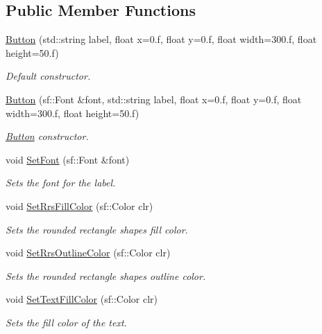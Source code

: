 \subsection*{Public Member Functions}
\begin{DoxyCompactItemize}
\item 
\mbox{\hyperlink{class_game_objects_1_1_button_a8fdd102aa18578cfed540502e2c25a37}{Button}} (std\+::string label, float x=0.f, float y=0.f, float width=300.f, float height=50.f)
\begin{DoxyCompactList}\small\item\em Default constructor. \end{DoxyCompactList}\item 
\mbox{\hyperlink{class_game_objects_1_1_button_a8cde4e0917819f05e9cf408c14bbc141}{Button}} (sf\+::\+Font \&font, std\+::string label, float x=0.f, float y=0.f, float width=300.f, float height=50.f)
\begin{DoxyCompactList}\small\item\em \mbox{\hyperlink{class_game_objects_1_1_button}{Button}} constructor. \end{DoxyCompactList}\item 
void \mbox{\hyperlink{class_game_objects_1_1_button_a88a855f086cf8c46a3a575b9ad858aa9}{Set\+Font}} (sf\+::\+Font \&font)
\begin{DoxyCompactList}\small\item\em Sets the font for the label. \end{DoxyCompactList}\item 
void \mbox{\hyperlink{class_game_objects_1_1_button_a2ec5d756fe1b74a36ff4878bc0b5d95a}{Set\+Rrs\+Fill\+Color}} (sf\+::\+Color clr)
\begin{DoxyCompactList}\small\item\em Sets the rounded rectangle shape\textquotesingle{}s fill color. \end{DoxyCompactList}\item 
void \mbox{\hyperlink{class_game_objects_1_1_button_ae4dc64a6c94fbbd37f184398f7aa5d5e}{Set\+Rrs\+Outline\+Color}} (sf\+::\+Color clr)
\begin{DoxyCompactList}\small\item\em Sets the rounded rectangle shape\textquotesingle{}s outline color. \end{DoxyCompactList}\item 
void \mbox{\hyperlink{class_game_objects_1_1_button_a78eba5d1428ece83f6aae4942f8e1dcf}{Set\+Text\+Fill\+Color}} (sf\+::\+Color clr)
\begin{DoxyCompactList}\small\item\em Sets the fill color of the text. \end{DoxyCompactList}\item 

\end{DoxyCompactItemize}

